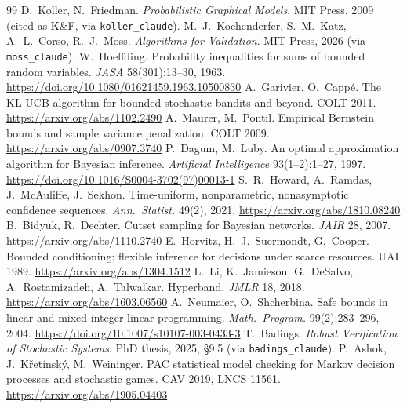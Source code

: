 \documentclass[10pt,a4paper]{article}
\newcommand{\code}[1]{\texttt{#1}}
\begin{document}
\begin{thebibliography}{99}\small
{} D.~Koller, N.~Friedman. \emph{Probabilistic Graphical Models}. MIT Press, 2009 (cited as K\&F, via \code{koller\_claude}).
 M.~J.~Kochenderfer, S.~M.~Katz, A.~L.~Corso, R.~J.~Moss. \emph{Algorithms for Validation}. MIT Press, 2026 (via \code{moss\_claude}).
 W.~Hoeffding. Probability inequalities for sums of bounded random variables. \emph{JASA} 58(301):13--30, 1963. \url{https://doi.org/10.1080/01621459.1963.10500830}
 A.~Garivier, O.~Cappé. The KL-UCB algorithm for bounded stochastic bandits and beyond. COLT 2011. \url{https://arxiv.org/abs/1102.2490}
 A.~Maurer, M.~Pontil. Empirical Bernstein bounds and sample variance penalization. COLT 2009. \url{https://arxiv.org/abs/0907.3740}
 P.~Dagum, M.~Luby. An optimal approximation algorithm for Bayesian inference. \emph{Artificial Intelligence} 93(1--2):1--27, 1997. \url{https://doi.org/10.1016/S0004-3702(97)00013-1}
 S.~R.~Howard, A.~Ramdas, J.~McAuliffe, J.~Sekhon. Time-uniform, nonparametric, nonasymptotic confidence sequences. \emph{Ann.\ Statist.} 49(2), 2021. \url{https://arxiv.org/abs/1810.08240}
 B.~Bidyuk, R.~Dechter. Cutset sampling for Bayesian networks. \emph{JAIR} 28, 2007. \url{https://arxiv.org/abs/1110.2740}
 E.~Horvitz, H.~J.~Suermondt, G.~Cooper. Bounded conditioning: flexible inference for decisions under scarce resources. UAI 1989. \url{https://arxiv.org/abs/1304.1512}
 L.~Li, K.~Jamieson, G.~DeSalvo, A.~Rostamizadeh, A.~Talwalkar. Hyperband. \emph{JMLR} 18, 2018. \url{https://arxiv.org/abs/1603.06560}
 A.~Neumaier, O.~Shcherbina. Safe bounds in linear and mixed-integer linear programming. \emph{Math.\ Program.} 99(2):283--296, 2004. \url{https://doi.org/10.1007/s10107-003-0433-3}
 T.~Badings. \emph{Robust Verification of Stochastic Systems}. PhD thesis, 2025, §9.5 (via \code{badings\_claude}).
 P.~Ashok, J.~Křetínský, M.~Weininger. PAC statistical model checking for Markov decision processes and stochastic games. CAV 2019, LNCS 11561. \url{https://arxiv.org/abs/1905.04403}
\end{thebibliography}
\end{document}
